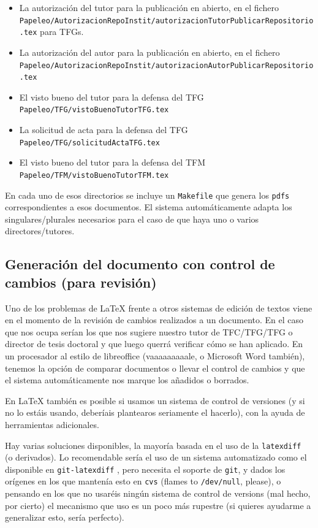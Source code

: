 \documentclass[spanish,openright]{book}
\begin{document}
\begin{itemize}
\item La autorización del tutor para la publicación en abierto, en el
  fichero
  \texttt{Papeleo/AutorizacionRepoInstit/autorizacionTutorPublicarRepositorio.tex}
  para TFGs.
\item La autorización del autor para la publicación en abierto, en el
  fichero
  \texttt{Papeleo/AutorizacionRepoInstit/autorizacionAutorPublicarRepositorio.tex}
\item El visto bueno del tutor para la defensa del TFG
  \texttt{Papeleo/TFG/vistoBuenoTutorTFG.tex}
\item La solicitud de acta para la defensa del TFG
  \texttt{Papeleo/TFG/solicitudActaTFG.tex}
\item El visto bueno del tutor para la defensa del TFM
  \texttt{Papeleo/TFM/vistoBuenoTutorTFM.tex}
\end{itemize}

En cada uno de esos directorios se incluye un \texttt{Makefile} que
genera los \texttt{pdfs} correspondientes a esos documentos. El
sistema automáticamente adapta los singulares/plurales necesarios para
el caso de que haya uno o varios directores/tutores.


\subsection{Generación del documento con control de cambios (para
  revisión)}
\label{sec:control-de-cambios}

Uno de los problemas de \LaTeX{} frente a otros sistemas de edición de
textos viene en el momento de la revisión de cambios realizados a un
documento. En el caso que nos ocupa serían los que nos sugiere nuestro
tutor de TFC/TFG/TFG o director de tesis doctoral y que luego querrá
verificar cómo se han aplicado. En un procesador al estilo de
libreoffice (vaaaaaaaaale, o Microsoft Word también), tenemos la opción
de comparar documentos o llevar el control de cambios y que el sistema
automáticamente nos marque los añadidos o borrados. 

En \LaTeX{} también es posible si usamos un sistema de control de
versiones (y si no lo estáis usando, deberíais plantearos seriamente el
hacerlo), con la ayuda de herramientas adicionales.

Hay varias soluciones disponibles, la mayoría basada en el uso de la
\texttt{latexdiff}~\cite{latexdiff} (o derivados). Lo recomendable
sería el uso de un sistema automatizado como el disponible en
\texttt{git-latexdiff} \cite{git-latexdiff}, pero necesita el soporte
de \texttt{git}, y dados los orígenes en los que mantenía esto en
\texttt{cvs} (flames to \texttt{/dev/null}, please), o pensando en los
que no usaréis ningún sistema de control de versions (mal hecho, por
cierto) el mecanismo que uso es un poco más rupestre (si quieres
ayudarme a generalizar esto, sería perfecto).
\end{document}
